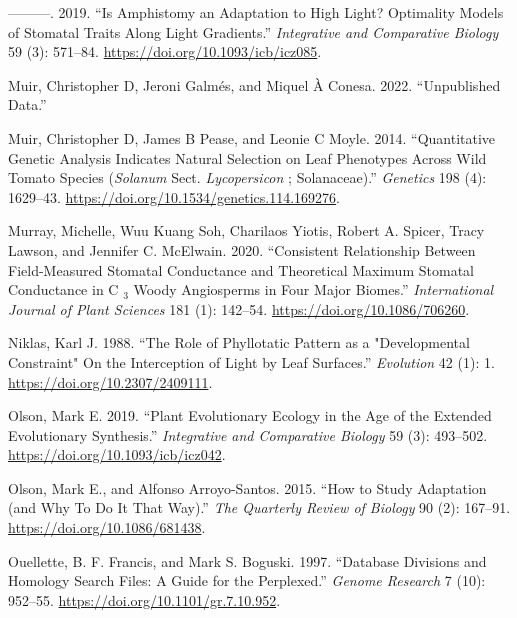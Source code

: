 \documentclass[
  12pt,
]{article}
\newlength{\cslhangindent}
\newlength{\cslentryspacingunit} %
\newenvironment{CSLReferences}[2] %
 {%
  \setlength{\parindent}{0pt}
  \ifodd #1
  \let\oldpar\par
  \def\par{\hangindent=\cslhangindent\oldpar}
  \fi
  \setlength{\parskip}{#2\cslentryspacingunit}
 }%
 {}
\begin{document}
\begin{CSLReferences}{1}{0}
\leavevmode{}%
---------. 2019. {``Is {Amphistomy} an {Adaptation} to {High} {Light}? {Optimality} {Models} of {Stomatal} {Traits} Along {Light} {Gradients}.''} \emph{Integrative and Comparative Biology} 59 (3): 571--84. \url{https://doi.org/10.1093/icb/icz085}.

\leavevmode{}%
Muir, Christopher D, Jeroni Galmés, and Miquel À Conesa. 2022. {``Unpublished Data.''}

\leavevmode{}%
Muir, Christopher D, James B Pease, and Leonie C Moyle. 2014. {``Quantitative {Genetic} {Analysis} {Indicates} {Natural} {Selection} on {Leaf} {Phenotypes} {Across} {Wild} {Tomato} {Species} (\emph{Solanum} Sect. \emph{Lycopersicon} ; {Solanaceae}).''} \emph{Genetics} 198 (4): 1629--43. \url{https://doi.org/10.1534/genetics.114.169276}.

\leavevmode{}%
Murray, Michelle, Wuu Kuang Soh, Charilaos Yiotis, Robert A. Spicer, Tracy Lawson, and Jennifer C. McElwain. 2020. {``Consistent {Relationship} Between {Field}-{Measured} {Stomatal} {Conductance} and {Theoretical} {Maximum} {Stomatal} {Conductance} in {C} \(_{\textrm{3}}\) {Woody} {Angiosperms} in {Four} {Major} {Biomes}.''} \emph{International Journal of Plant Sciences} 181 (1): 142--54. \url{https://doi.org/10.1086/706260}.

\leavevmode{}%
Niklas, Karl J. 1988. {``The {Role} of {Phyllotatic} {Pattern} as a "{Developmental} {Constraint}" {On} the {Interception} of {Light} by {Leaf} {Surfaces}.''} \emph{Evolution} 42 (1): 1. \url{https://doi.org/10.2307/2409111}.

\leavevmode{}%
Olson, Mark E. 2019. {``Plant {Evolutionary} {Ecology} in the {Age} of the {Extended} {Evolutionary} {Synthesis}.''} \emph{Integrative and Comparative Biology} 59 (3): 493--502. \url{https://doi.org/10.1093/icb/icz042}.

\leavevmode{}%
Olson, Mark E., and Alfonso Arroyo-Santos. 2015. {``How to {Study} {Adaptation} (and {Why} {To} {Do} {It} {That} {Way}).''} \emph{The Quarterly Review of Biology} 90 (2): 167--91. \url{https://doi.org/10.1086/681438}.

\leavevmode{}%
Ouellette, B. F. Francis, and Mark S. Boguski. 1997. {``Database {Divisions} and {Homology} {Search} {Files}: {A} {Guide} for the {Perplexed}.''} \emph{Genome Research} 7 (10): 952--55. \url{https://doi.org/10.1101/gr.7.10.952}.


\end{CSLReferences}
\end{document}
